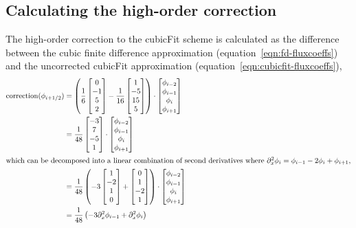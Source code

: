 \documentclass{article}
\begin{document}
\subsection*{Calculating the high-order correction}
The high-order correction to the cubicFit scheme is calculated as the difference between the cubic finite difference approximation (equation~\ref{eqn:fd-fluxcoeffs}) and the uncorrected cubicFit approximation (equation~\ref{eqn:cubicfit-fluxcoeffs}),
\begin{align}
	\mathrm{correction}(\phi_{i+1/2})
	&=
	\left(
	\frac{1}{6} 
	\begin{bmatrix}
		0 \\ -1 \\ 5 \\ 2
	\end{bmatrix}
	-
	\frac{1}{16}
	\begin{bmatrix}
		1 \\ -5 \\ 15 \\ 5
	\end{bmatrix}
	\right)
	\cdot
	\begin{bmatrix}
		\phi_{i-2} \\
		\phi_{i-1} \\
		\phi_i \\
		\phi_{i+1}
	\end{bmatrix} \\
	&=
	\frac{1}{48}
	\begin{bmatrix}
		-3 \\ 7 \\ -5 \\ 1
	\end{bmatrix}
	\cdot
	\begin{bmatrix}
		\phi_{i-2} \\
		\phi_{i-1} \\
		\phi_i \\
		\phi_{i+1}
	\end{bmatrix} \label{eqn:correction} \\
%
\intertext{which can be decomposed into a linear combination of second derivatives where $\partial_x^2 \phi_i = \phi_{i-1} - 2 \phi_i + \phi_{i+1}$,}
%
	&=
	\frac{1}{48} \left(
	-3 \begin{bmatrix}1 \\ -2 \\ 1 \\ 0\end{bmatrix}
	+ \begin{bmatrix}0 \\ 1 \\ -2 \\ 1\end{bmatrix}
	\right)
	\cdot
	\begin{bmatrix}
		\phi_{i-2} \\
		\phi_{i-1} \\
		\phi_i \\
		\phi_{i+1}
	\end{bmatrix} \\
	&=
	\frac{1}{48}
	\left( -3 \partial_x^2 \phi_{i-1} + \partial_x^2 \phi_i \right)
\end{align}
\end{document}

